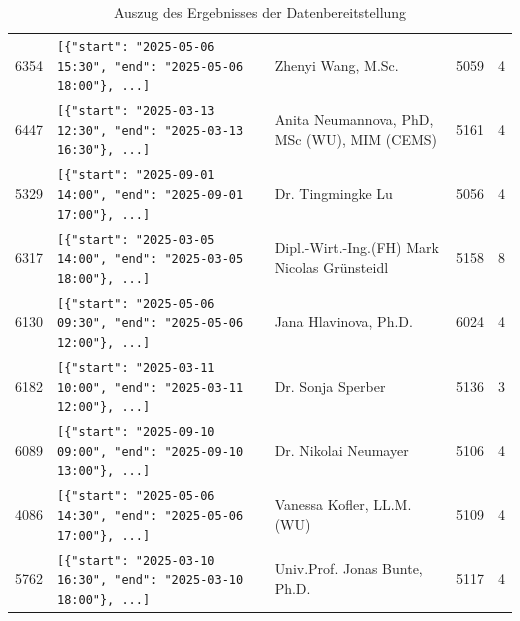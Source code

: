 \begin{table}
{\begin{tabular}{lllll}
            6354                & \verb|[{"start": "2025-05-06 15:30", "end": "2025-05-06 18:00"}, ...]| & Zhenyi Wang, M.Sc.                               & 5059               & 4             \\
            6447                & \verb|[{"start": "2025-03-13 12:30", "end": "2025-03-13 16:30"}, ...]| & Anita Neumannova, PhD, MSc (WU), MIM (CEMS)      & 5161               & 4             \\     5329          & \verb|[{"start": "2025-09-01 14:00", "end": "2025-09-01 17:00"}, ...]| & Dr. Tingmingke Lu                                  & 5056     & 4             \\
            6317                & \verb|[{"start": "2025-03-05 14:00", "end": "2025-03-05 18:00"}, ...]| & Dipl.-Wirt.-Ing.(FH) Mark Nicolas Grünsteidl     & 5158               & 8             \\
            6130                & \verb|[{"start": "2025-05-06 09:30", "end": "2025-05-06 12:00"}, ...]| & Jana Hlavinova, Ph.D.                            & 6024               & 4             \\
            6182                & \verb|[{"start": "2025-03-11 10:00", "end": "2025-03-11 12:00"}, ...]| & Dr. Sonja Sperber                                & 5136               & 3             \\
            6089                & \verb|[{"start": "2025-09-10 09:00", "end": "2025-09-10 13:00"}, ...]| & Dr. Nikolai Neumayer                             & 5106               & 4             \\
            4086                & \verb|[{"start": "2025-05-06 14:30", "end": "2025-05-06 17:00"}, ...]| & Vanessa Kofler, LL.M. (WU)                       & 5109               & 4             \\
            5762                & \verb|[{"start": "2025-03-10 16:30", "end": "2025-03-10 18:00"}, ...]| & Univ.Prof. Jonas Bunte, Ph.D.                    & 5117               & 4             \\
            \bottomrule
        \end{tabular}
    }
    \caption{Auszug des Ergebnisses der Datenbereitstellung}
    \label{tab:placeholder}
\end{table}

